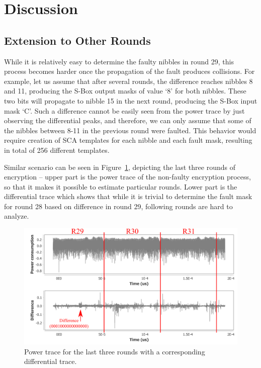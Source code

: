 \documentclass[10pt, conference, compsocconf]{IEEEtran}  %
\numberwithin{Definition}{section}
\numberwithin{Claim}{section}
\begin{document}
\section{Discussion}
\subsection{Extension to Other Rounds}
While it is relatively easy to determine the faulty nibbles in round 29, this process becomes harder once the propagation of the fault produces collisions. For example, let us assume that after several rounds, the difference reaches nibbles 8 and 11, producing the S-Box output masks of value `8' for both nibbles. These two bits will propagate to nibble 15 in the next round, producing the S-Box input mask `C'. Such a difference cannot be easily seen from the power trace by just observing the differential peaks, and therefore, we can only assume that some of the nibbles between 8-11 in the previous round were faulted. This behavior would require creation of SCA templates for each nibble and each fault mask, resulting in total of 256 different templates.   

Similar scenario can be seen in Figure~\ref{3rounds}, depicting the last three rounds of encryption -- upper part is the power trace of the non-faulty encryption process, so that it makes it possible to estimate particular rounds. Lower part is the differential trace which shows that while it is trivial to determine the fault mask for round 28 based on difference in round 29, following rounds are hard to analyze.
\begin{figure}
	\centering
	\includegraphics[width=0.9\linewidth]{3rounds_difference}
    \caption{Power trace for the last three rounds with a corresponding differential trace.}
    \label{3rounds}
\end{figure}
\end{document}
